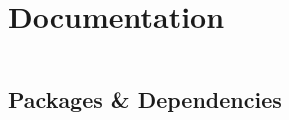 \documentclass[11pt]{report}
\begin{document}
	\tableofcontents

	\chapter{Documentation}
	
	\begin{phantom}
		\begin{verbatim}
		\end{verbatim}
	\end{phantom}

	\section{Packages \& Dependencies}
\end{document}
